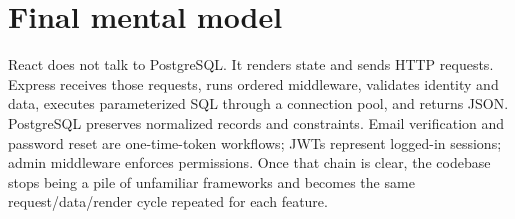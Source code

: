 \documentclass[11pt,oneside]{book}
\begin{document}
\backmatter
\chapter*{Final mental model}
React does not talk to PostgreSQL. It renders state and sends HTTP requests. Express receives those requests, runs ordered middleware, validates identity and data, executes parameterized SQL through a connection pool, and returns JSON. PostgreSQL preserves normalized records and constraints. Email verification and password reset are one-time-token workflows; JWTs represent logged-in sessions; admin middleware enforces permissions. Once that chain is clear, the codebase stops being a pile of unfamiliar frameworks and becomes the same request/data/render cycle repeated for each feature.
\end{document}
